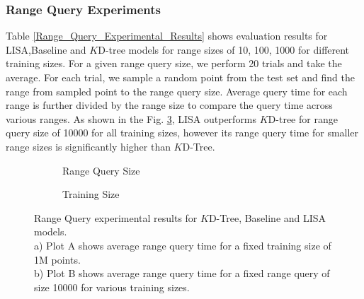 \subsubsection {Range Query Experiments}
Table \ref{Range_Query_Experimental_Results} shows evaluation results for LISA,Baseline and $K$D-tree models for range sizes of 10, 100, 1000 for different training sizes. For a given range query size, we perform 20 trials and take the average. For each trial, we sample a random point from the test set and find the range from sampled point to the range query size. Average query time for each range is further divided by the range size to compare the query time across various ranges. As shown in the Fig. \ref{fig:Range_Query_Comparision}, LISA outperforms $K$D-tree for range query size of 10000 for all training sizes, however its range query time for smaller range sizes is significantly higher than $K$D-Tree.

\begin{figure}
 \centering
     \begin{subfigure}[b]{0.45\textwidth}
         \centering
         
         \caption{Range Query Size}
         \label{fig:2d_exp2_2_1}
     \end{subfigure}
     \hfill
     \begin{subfigure}[b]{0.45\textwidth}
         \centering
         
         \caption{Training Size}
         \label{fig:2d_exp2_2_2}
     \end{subfigure}
     \hfill
     \caption{Range Query experimental results for $K$D-Tree, Baseline and LISA models.\\
     a) Plot A shows average range query time for a fixed training size of 1M points. \\ %
     b) Plot B shows average range query time for a fixed range query of size 10000 for various training sizes.} %
        \label{fig:Range_Query_Comparision}
\end{figure}

